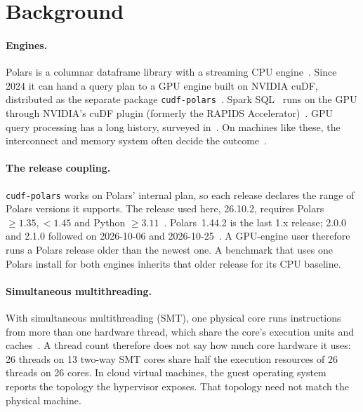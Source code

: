 \documentclass[11pt]{article}
\begin{document}
\section{Background}
\label{sec:background}

\paragraph{Engines.} Polars is a columnar dataframe library with a streaming
CPU engine~\citep{polars1442,polars200}. Since 2024 it can hand a query plan
to a GPU engine built on NVIDIA cuDF, distributed as the separate package
\texttt{cudf-polars}~\citep{semaan2024polarsgpu,polars_gpu_guide,cudf_polars_docs}.
Spark SQL~\citep{armbrust2015sparksql} runs on the GPU through NVIDIA's cuDF
plugin (formerly the RAPIDS Accelerator)~\citep{nvidia_cudf_spark_docs}. GPU
query processing has a long history, surveyed
in~\citep{bress2014gpudb,rosenfeld2022heterogeneous}. On machines like these,
the interconnect and memory system often decide the
outcome~\citep{lutz2020pump,shanbhag2020gpucpu}.

\paragraph{The release coupling.} \texttt{cudf-polars} works on Polars' internal
plan, so each release declares the range of Polars versions it supports. The
release used here, 26.10.2, requires Polars ${\ge}1.35,{<}1.45$ and Python
${\ge}3.11$~\citep{pypi_cudfpolars_26102}. Polars~1.44.2 is the last 1.x
release; 2.0.0 and 2.1.0 followed on 2026-10-06 and
2026-10-25~\citep{pypi_polars}. A GPU-engine user therefore runs a Polars
release older than the newest one. A benchmark that uses one Polars install
for both engines inherits that older release for its CPU baseline.

\paragraph{Simultaneous multithreading.} With simultaneous multithreading (SMT),
one physical core runs instructions from more than one hardware thread, which
share the core's execution units and caches~\citep{tullsen1995smt}. A thread
count therefore does not say how much core hardware it uses: 26 threads on 13
two-way SMT cores share half the execution resources of 26 threads on 26
cores. In cloud virtual machines, the guest operating system reports the
topology the hypervisor exposes. That topology need not match the physical
machine.
\end{document}
